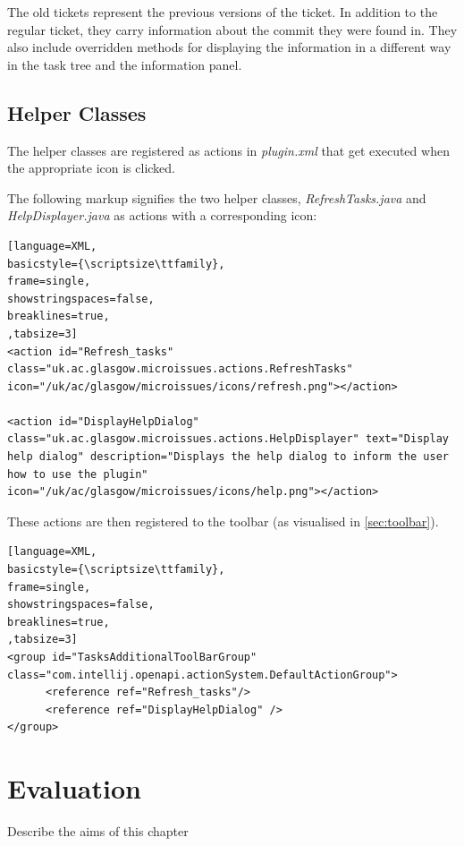 \documentclass{4thYearProject}
\begin{document}
The old tickets represent the previous versions of the ticket. In addition to the regular ticket, they carry information about the commit they were found in. They also include overridden methods for displaying the information in a different way in the task tree and the information panel.

\section{Helper Classes}

The helper classes are registered as actions in \textit{plugin.xml} that get executed when the appropriate icon is clicked.

The following markup signifies the two helper classes, \textit{RefreshTasks.java} and \textit{HelpDisplayer.java} as actions with a corresponding icon:

\begin{lstlisting}[language=XML, 
basicstyle={\scriptsize\ttfamily}, 
frame=single,
showstringspaces=false,
breaklines=true,
,tabsize=3]
<action id="Refresh_tasks" class="uk.ac.glasgow.microissues.actions.RefreshTasks" icon="/uk/ac/glasgow/microissues/icons/refresh.png"></action>

<action id="DisplayHelpDialog" class="uk.ac.glasgow.microissues.actions.HelpDisplayer" text="Display help dialog" description="Displays the help dialog to inform the user how to use the plugin" icon="/uk/ac/glasgow/microissues/icons/help.png"></action>

\end{lstlisting}

These actions are then registered to the toolbar (as visualised in \ref{sec:toolbar}).

\begin{lstlisting}[language=XML, 
basicstyle={\scriptsize\ttfamily}, 
frame=single,
showstringspaces=false,
breaklines=true,
,tabsize=3]
<group id="TasksAdditionalToolBarGroup" class="com.intellij.openapi.actionSystem.DefaultActionGroup">
      <reference ref="Refresh_tasks"/>
      <reference ref="DisplayHelpDialog" />
</group>

\end{lstlisting}

\chapter{Evaluation}

Describe the aims of this chapter
\end{document}
